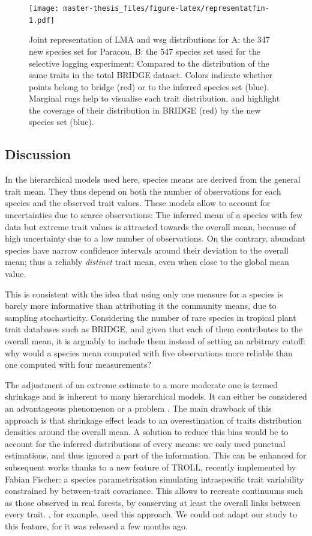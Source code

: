 \documentclass[12pt,]{article}
\theoremstyle{definition}
\theoremstyle{definition}
\theoremstyle{definition}
\theoremstyle{remark}
\begin{document}
\begin{figure}
\centering
\texttt{[image: master-thesis\_files/figure-latex/representatfin-1.pdf]}
\caption{\label{fig:representatfin} Joint representation of LMA and wsg
distributions for A: the 347 new species set for Paracou, B: the 547
species set used for the selective logging experiment; Compared to the
distribution of the same traits in the total BRIDGE dataset. Colors
indicate whether points belong to bridge (red) or to the inferred
species set (blue). Marginal rugs help to visualise each trait
distribution, and highlight the coverage of their distribution in BRIDGE
(red) by the new species set (blue).}
\end{figure}

\subsection{Discussion}\label{discussion}

In the hierarchical models used here, species means are derived from the
general trait mean. They thus depend on both the number of observations
for each species and the observed trait values. These models allow to
account for uncertainties due to scarce observations: The inferred mean
of a species with few data but extreme trait values is attracted towards
the overall mean, because of high uncertainty due to a low number of
observations. On the contrary, abundant species have narrow confidence
intervals around their deviation to the overall mean; thus a reliably
\emph{distinct} trait mean, even when close to the global mean value.

This is consistent with the idea that using only one measure for a
species is barely more informative than attributing it the community
means, due to sampling stochasticity. Considering the number of rare
species in tropical plant trait databases such as BRIDGE, and given that
each of them contributes to the overall mean, it is arguably to include
them instead of setting an arbitrary cutoff: why would a species mean
computed with five observations more reliable than one computed with
four measurements?

The adjustment of an extreme estimate to a more moderate one is termed
shrinkage and is inherent to many hierarchical models. It can either be
considered an advantageous phenomenon or a problem
\citep[\citet{Mould2013}, \citet{Savic2009}]{Rouder2005}. The main
drawback of this approach is that shrinkage effect leads to an
overestimation of traits distribution densities around the overall mean.
A solution to reduce this bias would be to account for the inferred
distributions of every means: we only used punctual estimations, and
thus ignored a part of the information. This can be enhanced for
subsequent works thanks to a new feature of TROLL, recently implemented
by Fabian Fischer: a species parametrization simulating intraspecific
trait variability constrained by between-trait covariance. This allows
to recreate continuums such as those observed in real forests, by
conserving at least the overall links between every trait.
\citet{Fyllas2014}, for example, used this approach. We could not adapt
our study to this feature, for it was released a few months ago.
\end{document}
